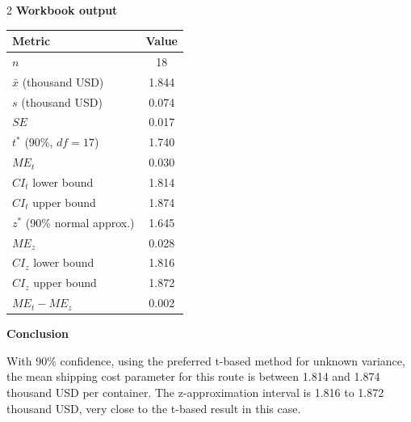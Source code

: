 \documentclass[12pt]{article}
\begin{document}
\begin{multicols}{2}
		\textbf{Workbook output}\par
		\begin{center}
			\begin{tabular}{l c}
				\hline
				Metric & Value \\
				\hline
				$n$ & 18 \\
				$\bar{x}$ (thousand USD) & 1.844 \\
				$s$ (thousand USD) & 0.074 \\
				$SE$ & 0.017 \\
				$t^*$ (90\%, $df=17$) & 1.740 \\
				$ME_t$ & 0.030 \\
				$CI_t$ lower bound & 1.814 \\
				$CI_t$ upper bound & 1.874 \\
				$z^*$ (90\% normal approx.) & 1.645 \\
				$ME_z$ & 0.028 \\
				$CI_z$ lower bound & 1.816 \\
				$CI_z$ upper bound & 1.872 \\
				$ME_t-ME_z$ & 0.002 \\
				\hline
			\end{tabular}
		\end{center}
		
		\textbf{Conclusion}\par
		With 90\% confidence, using the preferred t-based method for unknown variance, the mean shipping cost parameter for this route is between 1.814 and 1.874 thousand USD per container. The z-approximation interval is 1.816 to 1.872 thousand USD, very close to the t-based result in this case.
		
	\end{multicols}
	
\end{document}
